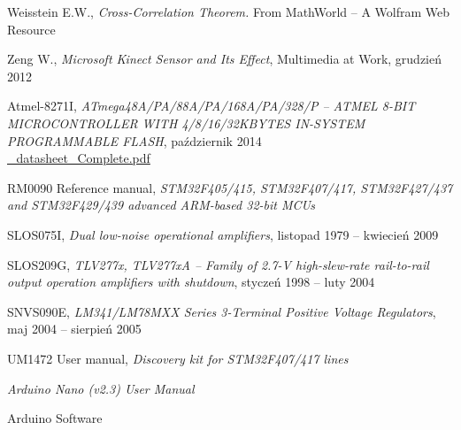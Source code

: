 \begin{thebibliography}{99}
     Weisstein E.W., 
  \textit{Cross-Correlation Theorem.} From MathWorld -- A Wolfram Web Resource 

   Zeng W.,
  \textit{Microsoft Kinect Sensor and Its Effect}, Multimedia at Work, grudzień 2012


  
     Atmel-8271I, \textit{ATmega48A/PA/88A/PA/168A/PA/328/P -- 
  ATMEL 8-BIT MICROCONTROLLER WITH 4/8/16/32KBYTES IN-SYSTEM PROGRAMMABLE FLASH}, październik 2014
  \\ \href{http://www.atmel.com/images/Atmel-8271-8-bit-AVR-Microcontroller-ATmega48A-48PA-88A-88PA-168A-168PA-328-328P_datasheet_Complete.pdf}{\_datasheet\_Complete.pdf}
  
     RM0090 Reference manual,
\textit{STM32F405/415, STM32F407/417, STM32F427/437 and
STM32F429/439 advanced ARM\textregistered-based 32-bit MCUs}
  
    SLOS075I, \textit{Dual low-noise operational amplifiers},
   listopad 1979 -- kwiecień 2009

    SLOS209G, \textit{TLV277x, TLV277xA -- Family 
  of 2.7-V high-slew-rate rail-to-rail output operation amplifiers with shutdown},
   styczeń 1998 -- luty 2004
  
   SNVS090E, \textit{LM341/LM78MXX Series 3-Terminal Positive Voltage Regulators},
   maj 2004 -- sierpień 2005
  

   UM1472 User manual, \textit{Discovery kit for STM32F407/417 lines}


  
  
  
  \textit{Arduino Nano (v2.3) User Manual}

  Arduino Software


\end{thebibliography}
